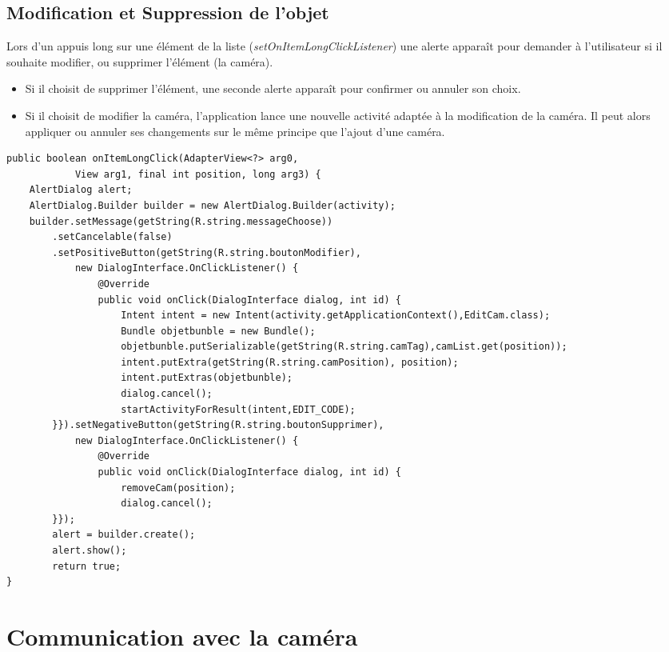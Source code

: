 \subsection{Modification et Suppression de l'objet}
Lors d'un appuis long sur une élément de la liste
(\textit{setOnItemLongClickListener}) une alerte apparaît pour demander à
l'utilisateur si il souhaite modifier, ou supprimer l'élément (la caméra).
\begin{itemize}
  \item Si il choisit de supprimer l'élément, une seconde alerte apparaît pour confirmer
ou annuler son choix. 
\item Si il choisit de modifier la caméra, l'application lance une nouvelle
activité adaptée à la modification de la caméra. Il peut alors appliquer ou
annuler ses changements sur le même principe que l'ajout d'une caméra.
\end{itemize}
\newpage
\begin{changemargin}{0cm}{0cm}
\begin{lstlisting}[caption={Gestion d'un appui long sur un élément de la
liste.}]
public boolean onItemLongClick(AdapterView<?> arg0, 
			View arg1, final int position, long arg3) { 
	AlertDialog alert; 
	AlertDialog.Builder builder = new AlertDialog.Builder(activity);
	builder.setMessage(getString(R.string.messageChoose))
		.setCancelable(false)
		.setPositiveButton(getString(R.string.boutonModifier),
			new DialogInterface.OnClickListener() {
				@Override
				public void onClick(DialogInterface dialog, int id) {
					Intent intent = new Intent(activity.getApplicationContext(),EditCam.class); 
					Bundle objetbunble = new Bundle();
					objetbunble.putSerializable(getString(R.string.camTag),camList.get(position));
					intent.putExtra(getString(R.string.camPosition), position);
					intent.putExtras(objetbunble);
					dialog.cancel();
					startActivityForResult(intent,EDIT_CODE);
		}}).setNegativeButton(getString(R.string.boutonSupprimer),
			new DialogInterface.OnClickListener() {
				@Override
				public void onClick(DialogInterface dialog, int id) {
					removeCam(position);
					dialog.cancel();
		}});
		alert = builder.create();
		alert.show();
		return true;
}
\end{lstlisting}
\end{changemargin}


\section{Communication avec la caméra}


